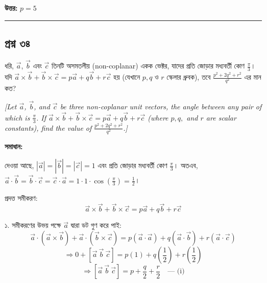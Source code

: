 \documentclass[11pt,a4paper]{article}
\begin{document}
\textbf{উত্তর:} $p = 5$

\vspace{0.5cm}
\hrule
\vspace{0.5cm}

\subsection*{প্রশ্ন ৩৪}

ধরি, $\vec{a}$, $\vec{b}$ এবং $\vec{c}$ তিনটি অসমতলীয় (non-coplanar) একক ভেক্টর, যাদের প্রতি জোড়ার মধ্যবর্তী কোণ $\frac{\pi}{3}$। যদি $\vec{a} \times \vec{b} + \vec{b} \times \vec{c} = p\vec{a} + q\vec{b} + r\vec{c}$ হয় (যেখানে $p, q$ ও $r$ স্কেলার ধ্রুবক), তবে $\frac{p^2+2q^2+r^2}{q^2}$ এর মান কত?

\smallskip
\textit{[Let $\vec{a}$, $\vec{b}$, and $\vec{c}$ be three non-coplanar unit vectors, the angle between any pair of which is $\frac{\pi}{3}$. If $\vec{a} \times \vec{b} + \vec{b} \times \vec{c} = p\vec{a} + q\vec{b} + r\vec{c}$ (where $p, q,$ and $r$ are scalar constants), find the value of $\frac{p^2+2q^2+r^2}{q^2}$.]}

\vspace{0.3cm}
\begin{center}
\end{center}

\textbf{সমাধান:}

দেওয়া আছে, $|\vec{a}| = |\vec{b}| = |\vec{c}| = 1$ এবং প্রতি জোড়ার মধ্যবর্তী কোণ $\frac{\pi}{3}$।
অতএব, $\vec{a} \cdot \vec{b} = \vec{b} \cdot \vec{c} = \vec{c} \cdot \vec{a} = 1 \cdot 1 \cdot \cos\left(\frac{\pi}{3}\right) = \frac{1}{2}$।

প্রদত্ত সমীকরণ:
$$\vec{a} \times \vec{b} + \vec{b} \times \vec{c} = p\vec{a} + q\vec{b} + r\vec{c}$$

১. সমীকরণের উভয় পক্ষে $\vec{a}$ দ্বারা ডট গুণ করে পাই:
$$\vec{a} \cdot (\vec{a} \times \vec{b}) + \vec{a} \cdot (\vec{b} \times \vec{c}) = p(\vec{a} \cdot \vec{a}) + q(\vec{a} \cdot \vec{b}) + r(\vec{a} \cdot \vec{c})$$
$$\Rightarrow 0 + [\vec{a} \ \vec{b} \ \vec{c}] = p(1) + q\left(\frac{1}{2}\right) + r\left(\frac{1}{2}\right)$$
$$\Rightarrow [\vec{a} \ \vec{b} \ \vec{c}] = p + \frac{q}{2} + \frac{r}{2} \quad \text{--- (i)}$$
\end{document}
